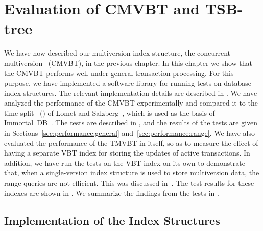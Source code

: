 \chapter{Evaluation of CMVBT and TSB-tree}
\label{chapter:performance}

We have now described our multiversion index structure, the concurrent
multiversion \Btree\ (CMVBT), in the previous chapter.
In this chapter we show that the CMVBT performs well under
general transaction processing.
For this purpose, we have implemented a software library for running
tests on database index structures.
The relevant implementation details are described in
. 
We have analyzed the performance of the CMVBT experimentally and
compared it to the time-split \Btree\ (\TSBtree) of Lomet and
Salzberg~\cite{lomet:1989:tsb,lomet:1990:tsb-performance},
which is used as the basis of
Immortal~DB~\cite{lomet:2006:transactiontime,lomet:2008:version-compression,lomet:2009:improving}.
The tests are described in , and the
results of the tests are given in Sections~\ref{sec:performance:general}
and~\ref{sec:performance:range}. 
We have also evaluated the performance of the TMVBT in itself, so as to
measure the effect of having a separate VBT index for storing the updates of
active transactions. 
In addition, we have run the tests on the VBT index on its own to demonstrate
that, when a single-version index structure is used to store multiversion
data, the range queries are not efficient. 
This was discussed in~.
The test results for these indexes are shown in
. 
We summarize the findings from the tests in .



\section{Implementation of the Index Structures}
\label{sec:performance:implementation}

